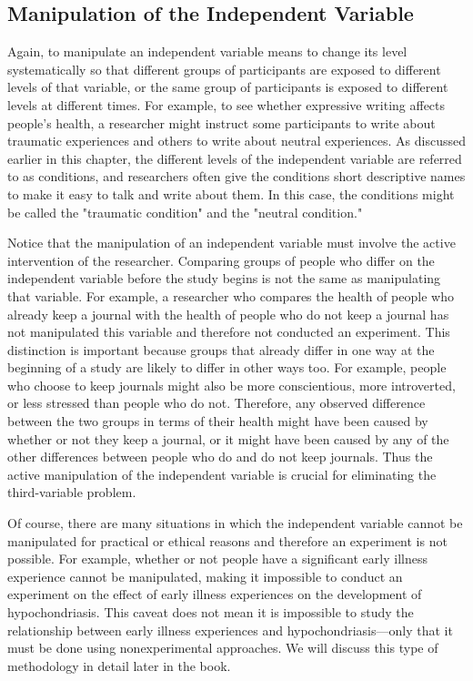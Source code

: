 \subsection{Manipulation of the Independent Variable}

Again, to manipulate an independent variable means to change its level systematically so that different groups of participants are exposed to different levels of that variable, or the same group of participants is exposed to different levels at different times. For example, to see whether expressive writing affects people's health, a researcher might instruct some participants to write about traumatic experiences and others to write about neutral experiences. As discussed earlier in this chapter, the different levels of the independent variable are referred to as conditions, and researchers often give the conditions short descriptive names to make it easy to talk and write about them. In this case, the conditions might be called the "traumatic condition" and the "neutral condition."

Notice that the manipulation of an independent variable must involve the active intervention of the researcher. Comparing groups of people who differ on the independent variable before the study begins is not the same as manipulating that variable. For example, a researcher who compares the health of people who already keep a journal with the health of people who do not keep a journal has not manipulated this variable and therefore not conducted an experiment. This distinction is important because groups that already differ in one way at the beginning of a study are likely to differ in other ways too. For example, people who choose to keep journals might also be more conscientious, more introverted, or less stressed than people who do not. Therefore, any observed difference between the two groups in terms of their health might have been caused by whether or not they keep a journal, or it might have been caused by any of the other differences between people who do and do not keep journals. Thus the active manipulation of the independent variable is crucial for eliminating the third-variable problem.

Of course, there are many situations in which the independent variable cannot be manipulated for practical or ethical reasons and therefore an experiment is not possible. For example, whether or not people have a significant early illness experience cannot be manipulated, making it impossible to conduct an experiment on the effect of early illness experiences on the development of hypochondriasis. This caveat does not mean it is impossible to study the relationship between early illness experiences and hypochondriasis---only that it must be done using nonexperimental approaches. We will discuss this type of methodology in detail later in the book.

